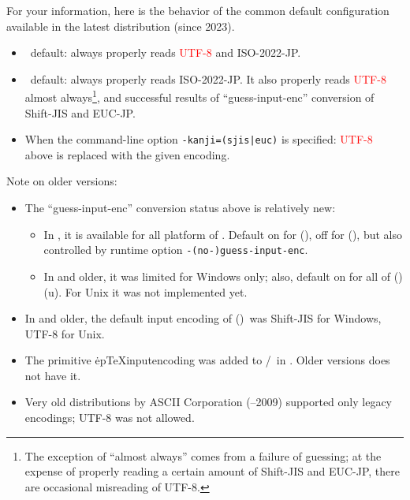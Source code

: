 \documentclass[a4paper,11pt,dvipdfmx]{article}
\def\code#1{\texttt{#1}}
\begin{document}
\begin{dangerous}
For your information, here is the behavior of the common default
configuration available in the latest \TL distribution (since 2023).
\begin{itemize}
 \def\Opt#1{\textcolor{red}{#1}}
 \item \upTeX\ default: always properly reads \Opt{UTF-8} and ISO-2022-JP.
 \item \pTeX\ default: always properly reads ISO-2022-JP.
   It also properly reads \Opt{UTF-8} almost always\footnote{The
   exception of ``almost always'' comes from a failure of guessing;
   at the expense of properly reading a certain amount of
   Shift-JIS and EUC-JP, there are occasional misreading of UTF-8.},
   and successful results of ``guess-input-enc'' conversion of
   Shift-JIS and EUC-JP.
 \item When the command-line option \verb+-kanji=(sjis|euc)+ is
   specified: \Opt{UTF-8} above is replaced with the given encoding.
\end{itemize}
\end{dangerous}

\begin{dangerous}
Note on older versions:
\begin{itemize}
 \item The ``guess-input-enc'' conversion status above is relatively new:
  \begin{itemize}
   \item In , it is available for all platform of \TL.
     Default on for (\eTeXpre)\pTeX, off for (\eTeXpre)\upTeX,
     but also controlled by runtime option \code{-(no-)guess-input-enc}.
   \item In  and older, it was limited for Windows only;
     also, default on for all of (\eTeXpre)(u)\pTeX.
     For Unix it was not implemented yet.
  \end{itemize}
 \item In  and older,
   the default input encoding of (\eTeXpre)\pTeX\ was
   Shift-JIS for Windows, UTF-8 for Unix.
 \item The primitive \.{epTeXinputencoding} was added to
   \epTeX/\eupTeX\ in . Older versions does not have it.
 \item Very old distributions by ASCII Corporation (--2009)
   supported only legacy encodings; UTF-8 was not allowed.
\end{itemize}
\end{dangerous}
\end{document}
